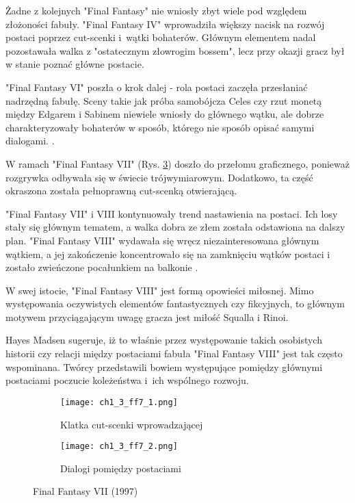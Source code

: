 \newpage

Żadne z kolejnych "Final Fantasy" nie wniosły zbyt wiele pod względem złożoności fabuły. "Final Fantasy
IV" wprowadziła większy nacisk na rozwój postaci poprzez cut-scenki i~wątki bohaterów. Głównym elementem
nadal pozostawała walka z "ostatecznym złowrogim bossem", lecz przy okazji gracz był w stanie poznać
główne postacie\cite{the_evolution_of_final_fantasy}.

"Final Fantasy VI" poszła o krok dalej - rola postaci zaczęła przesłaniać nadrzędną fabułę. Sceny takie
jak próba samobójcza Celes czy rzut monetą między Edgarem i Sabinem niewiele wniosły do głównego wątku,
ale dobrze charakteryzowały bohaterów w sposób, którego nie sposób opisać samymi dialogami.
\cite{the_evolution_of_final_fantasy}.

W ramach "Final Fantasy VII" (Rys. \ref{fig:ch1_3_ff7}) doszło do przełomu graficznego, ponieważ
rozgrywka odbywała się w świecie trójwymiarowym. Dodatkowo, ta część okraszona została pełnoprawną
cut-scenką otwierającą.

"Final Fantasy VII" i VIII kontynuowały trend nastawienia na postaci.
Ich losy stały się głównym tematem, a walka dobra ze złem została odstawiona na dalszy plan.
"Final Fantasy VIII" wydawała się wręcz niezainteresowana głównym wątkiem, a jej zakończenie
koncentrowało się na zamknięciu wątków postaci i zostało zwieńczone pocałunkiem na balkonie
\cite{the_evolution_of_final_fantasy}.

W swej istocie, "Final Fantasy VIII" jest formą opowieści miłosnej. Mimo występowania oczywistych
elementów fantastycznych czy fikcyjnych, to głównym motywem przyciągającym uwagę gracza jest
miłość Squalla i Rinoi\cite{25_years_later}.

Hayes Madsen sugeruje, iż to właśnie przez występowanie takich osobistych historii czy relacji między
postaciami fabuła "Final Fantasy VIII" jest tak często wspominana. Twórcy przedstawili bowiem występujące
pomiędzy głównymi postaciami poczucie koleżeństwa i~ich wspólnego rozwoju\cite{25_years_later}.

\begin{figure}[h]
    \begin{subfigure}{0.49\textwidth}
        \caption{Klatka cut-scenki wprowadzającej}
        \texttt{[image: ch1\_3\_ff7\_1.png]}
        \label{subfig:ch_1_3_ff7_1}
    \end{subfigure}
    \begin{subfigure}{0.49\textwidth}
        \caption{Dialogi pomiędzy postaciami}
        \texttt{[image: ch1\_3\_ff7\_2.png]}
        \label{subfig:ch_1_3_ff7_2}
    \end{subfigure}
    \caption{Final Fantasy VII (1997)}
    \label{fig:ch1_3_ff7}
\end{figure}


